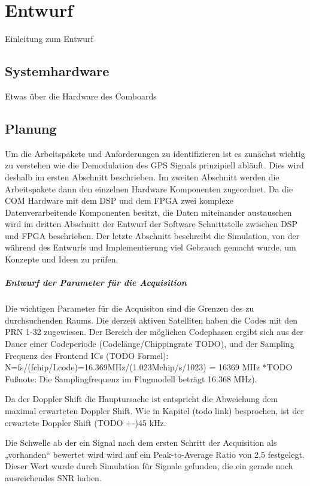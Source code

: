 \chapter{Entwurf}
Einleitung zum Entwurf

\section{Systemhardware}
Etwas über die Hardware des Comboards

\section{Planung}
Um die Arbeitspakete und Anforderungen zu identifizieren ist es zunächst wichtig zu verstehen wie die Demodulation des GPS Signals prinzipiell abläuft. Dies wird deshalb im ersten Abschnitt beschrieben. Im zweiten Abschnitt werden die Arbeitspakete dann den einzelnen Hardware Komponenten zugeordnet. Da die COM Hardware mit dem DSP und dem FPGA zwei komplexe Datenverarbeitende Komponenten besitzt, die Daten miteinander austauschen wird im dritten Abschnitt der Entwurf der Software Schnittstelle zwischen DSP und FPGA beschrieben. Der letzte Abschnitt beschreibt die Simulation, von der während des Entwurfs und Implementierung viel Gebrauch gemacht wurde, um Konzepte und Ideen zu prüfen.

\paragraph{Entwurf der Parameter für die Acquisition}
Die wichtigen Parameter für die Acquisiton sind die Grenzen des zu durchsuchenden Raums.
Die derzeit aktiven Satelliten haben die Codes mit den PRN 1-32 zugewiesen. Der Bereich der möglichen Codephasen ergibt sich aus der Dauer einer Codeperiode (Codelänge/Chippingrate TODO), und der Sampling Frequenz des Frontend ICs (TODO Formel): N=fs/(fchip/Lcode)=16.369MHz/(1.023Mchip/s/1023) = 16369 MHz *TODO Fußnote: Die Samplingfrequenz im Flugmodell beträgt 16.368 MHz).

Da der Doppler Shift die Hauptursache ist entspricht die Abweichung dem maximal erwarteten Doppler Shift. Wie in Kapitel (todo link) besprochen, ist der erwartete Doppler Shift (TODO +-)45 kHz.

Die Schwelle ab der ein Signal nach dem ersten Schritt der Acquisition als „vorhanden“ bewertet wird wird auf ein Peak-to-Average Ratio von 2,5 festgelegt. Dieser Wert wurde durch Simulation für Signale gefunden, die ein gerade noch ausreichendes SNR haben.




